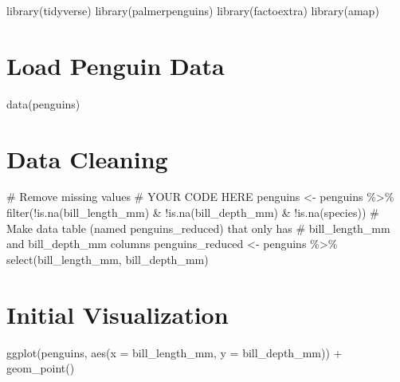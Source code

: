 \documentclass[
  letterpaper,
  DIV=11,
  numbers=noendperiod]{scrartcl}
\newenvironment{Shaded}{\begin{snugshade}}{\end{snugshade}}
\newcommand{\AttributeTok}[1]{\textcolor[rgb]{0.40,0.45,0.13}{#1}}
\newcommand{\CommentTok}[1]{\textcolor[rgb]{0.37,0.37,0.37}{#1}}
\newcommand{\FunctionTok}[1]{\textcolor[rgb]{0.28,0.35,0.67}{#1}}
\newcommand{\NormalTok}[1]{\textcolor[rgb]{0.00,0.23,0.31}{#1}}
\newcommand{\OtherTok}[1]{\textcolor[rgb]{0.00,0.23,0.31}{#1}}
\newcommand{\SpecialCharTok}[1]{\textcolor[rgb]{0.37,0.37,0.37}{#1}}
\begin{document}
\begin{Shaded}
\begin{Highlighting}[]
\FunctionTok{library}\NormalTok{(tidyverse)}
\FunctionTok{library}\NormalTok{(palmerpenguins)}
\FunctionTok{library}\NormalTok{(factoextra)}
\FunctionTok{library}\NormalTok{(amap)}
\end{Highlighting}
\end{Shaded}

\section{Load Penguin Data}\label{load-penguin-data}

\begin{Shaded}
\begin{Highlighting}[]
\FunctionTok{data}\NormalTok{(penguins)}
\end{Highlighting}
\end{Shaded}

\section{Data Cleaning}\label{data-cleaning}

\begin{Shaded}
\begin{Highlighting}[]
\CommentTok{\# Remove missing values}
\CommentTok{\# YOUR CODE HERE}
\NormalTok{penguins }\OtherTok{\textless{}{-}}\NormalTok{ penguins }\SpecialCharTok{\%\textgreater{}\%}
  \FunctionTok{filter}\NormalTok{(}\SpecialCharTok{!}\FunctionTok{is.na}\NormalTok{(bill\_length\_mm) }\SpecialCharTok{\&} \SpecialCharTok{!}\FunctionTok{is.na}\NormalTok{(bill\_depth\_mm) }\SpecialCharTok{\&} \SpecialCharTok{!}\FunctionTok{is.na}\NormalTok{(species))}
\CommentTok{\# Make data table (named penguins\_reduced) that only has}
\CommentTok{\# bill\_length\_mm and bill\_depth\_mm columns}
\NormalTok{penguins\_reduced }\OtherTok{\textless{}{-}}\NormalTok{ penguins }\SpecialCharTok{\%\textgreater{}\%} \FunctionTok{select}\NormalTok{(bill\_length\_mm, bill\_depth\_mm)}
\end{Highlighting}
\end{Shaded}

\section{Initial Visualization}\label{initial-visualization}

\begin{Shaded}
\begin{Highlighting}[]
\FunctionTok{ggplot}\NormalTok{(penguins, }\FunctionTok{aes}\NormalTok{(}\AttributeTok{x =}\NormalTok{ bill\_length\_mm, }\AttributeTok{y =}\NormalTok{ bill\_depth\_mm)) }\SpecialCharTok{+} 
  \FunctionTok{geom\_point}\NormalTok{() }
\end{Highlighting}
\end{Shaded}
\end{document}
